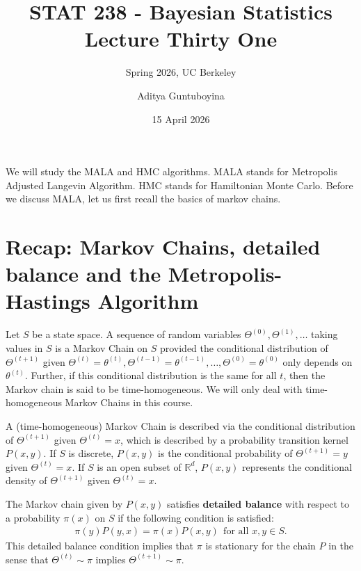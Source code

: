 \documentclass{scrartcl}
\newcommand{\R}{{\mathbb R}}
\begin{document}
\title{STAT 238 - Bayesian Statistics  \\
  Lecture Thirty One} 
\subtitle{Spring 2026, UC Berkeley}

\author{Aditya Guntuboyina}


\date{15 April 2026}

\maketitle

We will study the MALA and HMC algorithms. MALA stands for Metropolis
Adjusted Langevin Algorithm. HMC stands for Hamiltonian Monte
Carlo. Before we discuss MALA, let us first recall the basics of
markov chains. 

\section{Recap: Markov Chains, detailed balance and the
  Metropolis-Hastings Algorithm}

Let $S$ be a state space. A sequence of random variables $\Theta^{(0)},
\Theta^{(1)}, \dots$ taking values in $S$ is a 
Markov Chain on $S$ provided the conditional distribution of  
$\Theta^{(t+1)}$ given $\Theta^{(t)} = \theta^{(t)}, \Theta^{(t-1)} =
\theta^{(t-1)}, \dots, \Theta^{(0)} = \theta^{(0)}$ only depends on
$\theta^{(t)}$. Further, if this conditional distribution is the same
for all  $t$, then the Markov chain is said to be
time-homogeneous. We will only deal with time-homogeneous Markov
Chains in this course.

A (time-homogeneous) Markov Chain is described via the conditional
distribution of $\Theta^{(t+1)}$ given $\Theta^{(t)} = x$, which is
described by a probability transition kernel $P(x, y)$. If $S$ is
discrete, $P(x, y)$ is the conditional probability of $\Theta^{(t+1)}
= y$ given $\Theta^{(t)} = x$. If $S$ is an open subset of $\R^d$,
$P(x, y)$ represents the conditional density of $\Theta^{(t+1)}$ given
$\Theta^{(t)} = x$.

The Markov chain given by $P(x, y)$ satisfies \textbf{detailed
  balance} with respect to a probability $\pi(x)$ on $S$ if the
following condition is satisfied:
\begin{align}\label{det_bal}
  \pi(y) P(y, x) = \pi(x) P(x, y) ~~\text{for all $x, y \in S$}. 
\end{align}
This detailed balance condition implies that $\pi$ is stationary for
the chain $P$ in the sense that $\Theta^{(t)} \sim \pi$ implies
$\Theta^{(t+1)} \sim \pi$.
\end{document}
